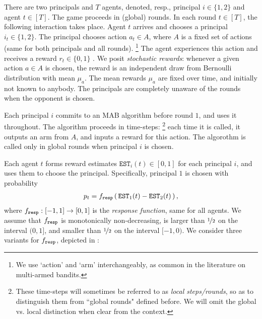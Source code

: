  There are two principals and $T$ agents,
denoted, resp., principal $i\in \{1,2\}$ and agent $t\in [T]$. The game proceeds in (global) rounds. In each round $t\in [T]$, the following  interaction takes place. Agent $t$ arrives and chooses a principal $i_t\in \{1,2\}$. The principal chooses action $a_t\in A$, where $A$ is a fixed set of actions (same for both principals and all rounds).%
\footnote{We use `action' and `arm' interchangeably, as common in the literature on multi-armed bandits.}
The agent experiences this action and receives a reward $r_t\in \{ 0,1\}$ . We posit \emph{stochastic rewards}: whenever a given action $a\in A$ is chosen, the reward is an independent draw from Bernoulli distribution with mean $\mu_a$. The mean rewards $\mu_a$ are fixed over time, and initially not known to anybody. The principals are completely unaware of the rounds when the opponent is chosen.
 
 
Each principal $i$ commits to an MAB algorithm \alg[i] before round $1$, and uses it throughout. The algorithm proceeds in time-steps:%
\footnote{These time-steps will sometimes be referred to as \emph{local steps/rounds}, so as to distinguish them from ``global rounds" defined before. We will omit the global vs. local distinction when clear from the context.} each time it is called, it outputs an arm from $A$, and inputs a reward for this action. The algorothm is called only in global rounds when principal $i$ is chosen.

\newcommand{\est}{\mathtt{EST}}


 Each agent $t$ forms reward estimates $\est_i(t)\in [0,1]$ for each principal $i$, and uses them to choose the principal. Specifically, principal $1$ is chosen with probability
\begin{align}\label{eq:model-f}
p_t = \respF\rbr{ \est_1(t) - \est_2(t) },
\end{align}
where $f_{\mathtt{resp}}:[-1,1]\to [0,1]$ is the \emph{response function}, same for all agents. We assume that $f_{\mathtt{resp}}$ is monotonically non-decreasing, is larger than $\nicefrac12$ on the interval $(0,1]$, and smaller than $\nicefrac12$ on the interval $[-1,0)$. We consider three variants for $f_{\mathtt{resp}}$, depicted in  :

